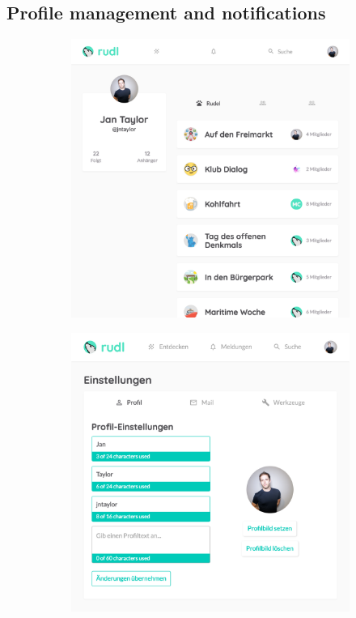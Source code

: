 \documentclass[12pt,numbers=noenddot,parskip,bibliography=totocnumbered,listof=totocnumbered,draft]{scrreprt}
\begin{document}
\subsection{Profile management and notifications}
\begin{figure}
\begin{subfigure}[t]{0.45\textwidth}%
\centering
\includegraphics[width=\linewidth]{user.png}
\caption{}
\label{user}
\end{subfigure}%
\hfill
\begin{subfigure}[t]{0.45\textwidth}%
\centering
\includegraphics[width=\linewidth]{settings.png}
\caption{}
\label{settings}
\end{subfigure}%


\end{figure}
\end{document}
